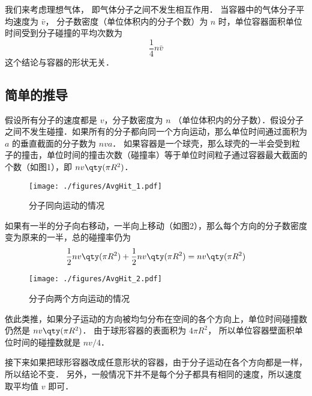 
我们来考虑理想气体， 即气体分子之间不发生相互作用． 当容器中的气体分子平均速度为 $\bar v$， 分子数密度（单位体积内的分子个数）为 $n$ 时，单位容器面积单位时间受到分子碰撞的平均次数为
\begin{equation}
\frac14 n\bar v
\end{equation}
这个结论与容器的形状无关．

\subsection{简单的推导}

假设所有分子的速度都是 $v$，分子数密度为 $n$ （单位体积内的分子数）．假设分子之间不发生碰撞．如果所有的分子都向同一个方向运动，那么单位时间通过面积为 $a$ 的垂直截面的分子数为 $nva$． 如果容器是一个球壳，那么球壳的一半会受到粒子的撞击，单位时间的撞击次数（碰撞率）等于单位时间粒子通过容器最大截面的个数（如图1），即 $nv \qty(\pi R^2)$． 
\begin{figure}[ht]
\centering
\texttt{[image: ./figures/AvgHit\_1.pdf]}
\caption{分子同向运动的情况} \label{AvgHit_fig1}
\end{figure}
如果有一半的分子向右移动，一半向上移动（如图2），那么每个方向的分子数密度变为原来的一半，总的碰撞率仍为
\begin{equation}
\frac12 nv \qty(\pi R^2) + \frac12 nv \qty(\pi R^2) = nv \qty(\pi R^2)
\end{equation}

\begin{figure}[ht]
\centering
\texttt{[image: ./figures/AvgHit\_2.pdf]}
\caption{分子向两个方向运动的情况} \label{AvgHit_fig2}
\end{figure}
依此类推，如果分子运动的方向被均匀分布在空间的各个方向上，单位时间碰撞数仍然是 $nv \qty(\pi R^2)$．
由于球形容器的表面积为 $4\pi R^2$， 所以单位容器壁面积单位时间的碰撞数就是 $nv/4$． 

接下来如果把球形容器改成任意形状的容器，由于分子运动在各个方向都是一样，所以结论不变． 另外，一般情况下并不是每个分子都具有相同的速度，所以速度取平均值 $v$ 即可．

